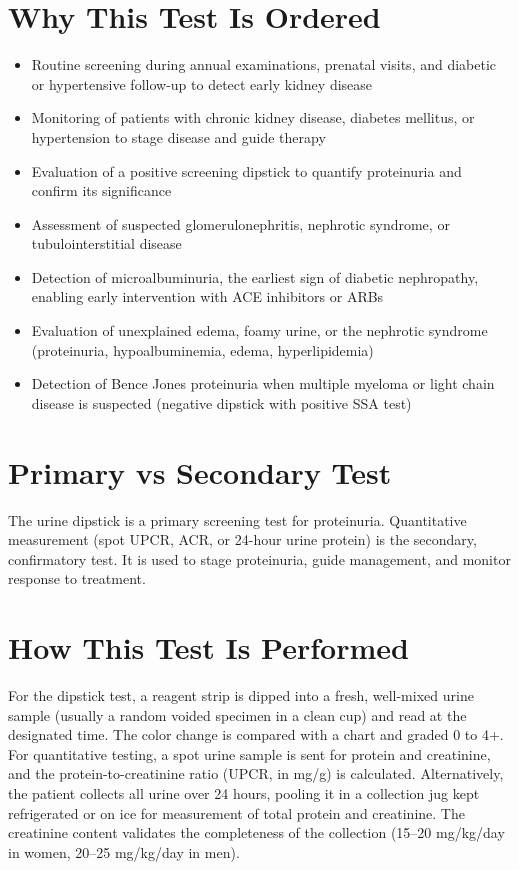 \section*{Why This Test Is Ordered}
\begin{itemize}
  \item Routine screening during annual examinations, prenatal visits, and diabetic or hypertensive follow-up to detect early kidney disease
  \item Monitoring of patients with chronic kidney disease, diabetes mellitus, or hypertension to stage disease and guide therapy \cite{kasiske1998meta}
  \item Evaluation of a positive screening dipstick to quantify proteinuria and confirm its significance
  \item Assessment of suspected glomerulonephritis, nephrotic syndrome, or tubulointerstitial disease
  \item Detection of microalbuminuria, the earliest sign of diabetic nephropathy, enabling early intervention with ACE inhibitors or ARBs
  \item Evaluation of unexplained edema, foamy urine, or the nephrotic syndrome (proteinuria, hypoalbuminemia, edema, hyperlipidemia)
  \item Detection of Bence Jones proteinuria when multiple myeloma or light chain disease is suspected (negative dipstick with positive SSA test)
\end{itemize}
\section*{Primary vs Secondary Test}
The urine dipstick is a primary screening test for proteinuria. Quantitative measurement (spot UPCR, ACR, or 24-hour urine protein) is the secondary, confirmatory test. It is used to stage proteinuria, guide management, and monitor response to treatment.
\section*{How This Test Is Performed}
For the dipstick test, a reagent strip is dipped into a fresh, well-mixed urine sample (usually a random voided specimen in a clean cup) and read at the designated time. The color change is compared with a chart and graded 0 to 4+. For quantitative testing, a spot urine sample is sent for protein and creatinine, and the protein-to-creatinine ratio (UPCR, in mg/g) is calculated. Alternatively, the patient collects all urine over 24 hours, pooling it in a collection jug kept refrigerated or on ice for measurement of total protein and creatinine. The creatinine content validates the completeness of the collection (15--20 mg/kg/day in women, 20--25 mg/kg/day in men).
